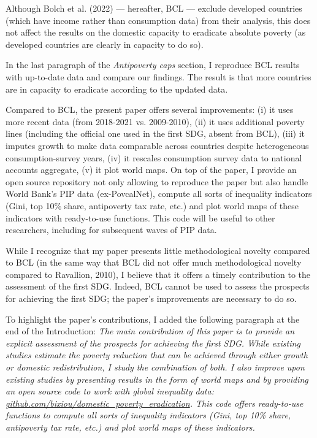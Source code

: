 \documentclass[12pt,english]{article}
\begin{document}
Although Bolch et al. (2022) --- hereafter, BCL --- exclude developed countries (which have income rather than consumption data) from their analysis, this does not affect the results on the domestic capacity to eradicate absolute poverty (as developed countries are clearly in capacity to do so). 

In the last paragraph of the \textit{Antipoverty caps} section, I reproduce BCL results with up-to-date data and compare our findings. The result is that more countries are in capacity to eradicate according to the updated data. 

Compared to BCL, the present paper offers several improvements: (i) it uses more recent data (from 2018-2021 vs. 2009-2010), (ii) it uses additional poverty lines (including the official one used in the first SDG, absent from BCL), (iii) it imputes growth to make data comparable across countries despite heterogeneous consumption-survey years, (iv) it rescales consumption survey data to national accounts aggregate, (v) it plot world maps. On top of the paper, I provide an open source repository not only allowing to reproduce the paper but also handle World Bank's PIP data (ex-PovcalNet), compute all sorts of inequality indicators (Gini, top 10\% share, antipoverty tax rate, etc.) and plot world maps of these indicators with ready-to-use functions. This code will be useful to other researchers, including for subsequent waves of PIP data. 

While I recognize that my paper presents little methodological novelty compared to BCL (in the same way that BCL did not offer much methodological novelty compared to Ravallion, 2010), I believe that it offers a timely contribution to the assessment of the first SDG. Indeed, BCL cannot be used to assess the prospects for achieving the first SDG; the paper's improvements are necessary to do so. 

To highlight the paper's contributions, I added the following paragraph at the end of the Introduction: \textit{The main contribution of this paper is to provide an explicit assessment of the prospects for achieving the first SDG. While existing studies estimate the poverty reduction that can be achieved through either growth or domestic redistribution, I study the combination of both. I also improve upon existing studies by presenting results in the form of world maps and by providing an open source code to work with global inequality data: \href{https://github.com/bixiou/domestic_poverty_eradication}{github.com/bixiou/domestic\_poverty\_eradication}. This code offers ready-to-use functions to compute all sorts of inequality indicators (Gini, top 10\% share, antipoverty tax rate, etc.) and plot world maps of these indicators.}
~\\ ~\\
\end{document}
